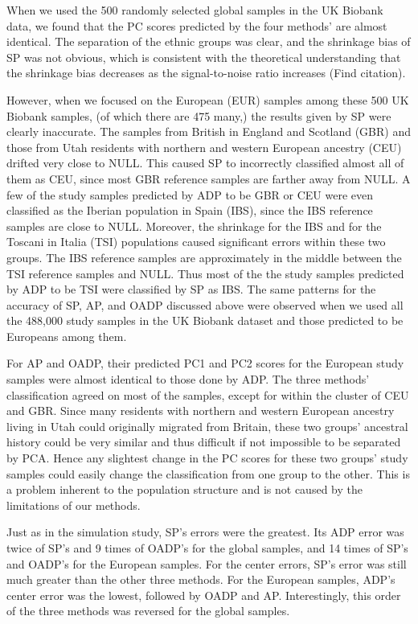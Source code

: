 \documentclass{article}
\newcommand{\todo}[1]{{\color{red} (#1)}}
\begin{document}
When we used the 500 randomly selected global samples
in the UK Biobank data,
we found that the PC scores predicted by the four methods' are almost identical.
The separation of the ethnic groups was clear,
and the shrinkage bias of SP was not obvious,
which is consistent with the theoretical understanding
that the shrinkage bias decreases
as the signal-to-noise ratio increases \todo{Find citation}.

However, when we focused on the European (EUR) samples
among these 500 UK Biobank samples,
(of which there are 475 many,)
the results given by SP were clearly inaccurate.
The samples from British in England and Scotland (GBR)
and those from Utah residents with northern and western European ancestry	(CEU)
drifted very close to NULL.
This caused SP to incorrectly classified almost all of them as CEU,
since most GBR reference samples are farther away from NULL.
A few of the study samples predicted by ADP to be GBR or CEU
were even classified as the Iberian population in Spain (IBS),
since the IBS reference samples are close to NULL.
Moreover, the shrinkage for the IBS
and for the Toscani in Italia (TSI) populations
caused significant errors within these two groups.
The IBS reference samples
are approximately in the middle
between the TSI reference samples and NULL.
Thus most of the the study samples predicted by ADP to be TSI
were classified by SP as IBS.
The same patterns for the accuracy
of SP, AP, and OADP
discussed above
were observed
when we used all the 488,000 study samples in the UK Biobank dataset
and those predicted to be Europeans among them.

For AP and OADP, their predicted PC1 and PC2 scores
for the European study samples
were almost identical
to those done by ADP.
The three methods' classification
agreed on most of the samples,
except for within the cluster of CEU and GBR.
Since many residents with northern and western European ancestry living in Utah
could originally migrated from Britain,
these two groups' ancestral history could be very similar
and thus difficult if not impossible to be separated by PCA.
Hence any slightest change
in the PC scores for these two groups' study samples
could easily change the classification from one group to the other.
This is a problem inherent to the population structure
and is not caused by the limitations of our methods.

Just as in the simulation study,
SP's errors were the greatest.
Its ADP error
was twice of SP's and 9 times of OADP's for the global samples,
and 14 times of SP's and OADP's for the European samples.
For the center errors,
SP's error was still much greater than the other three methods.
For the European samples,
ADP's center error was the lowest,
followed by OADP and AP.
Interestingly, this order of the three methods
was reversed for the global samples.
\end{document}

